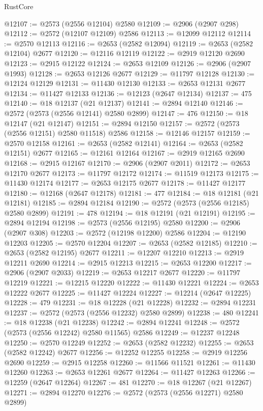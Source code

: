 \begin{lexlean}{RustCore}
\begin{coremodule}
@12107 := @2573 (@2556 @12104) @2580
@12109 := @2906 (@2907 @298)
@12112 := @2572 (@12107 @12109) @2586
@12113 := @12099 @12112
@12114 := @2570 @12113
@12116 := @2653 (@2582 @12094)
@12119 := @2653 (@2582 @12104) @2677
@12120 := @12116 @12119
@12122 := @2919 @12120 @2690
@12123 := @2915 @12122
@12124 := @2653 @12109
@12126 := @2906 (@2907 @1993)
@12128 := @2653 @12126 @2677
@12129 := @11797 @12128
@12130 := @12124 @12129
@12131 := @11430 @12130
@12133 := @2653 @12131 @2677
@12134 := @11427 @12133
@12136 := @12123 (@2647 @12134)
@12137 := 475
@12140 := @18 @12137 (@21 @12137)
@12141 := @2894 @12140
@12146 := @2572 (@2573 (@2556 @12141) @2580 @2899)
@12147 := 476
@12150 := @18 @12147 (@21 @12147)
@12151 := @2894 @12150
@12157 := @2572 (@2573 (@2556 @12151) @2580 @11518) @2586
@12158 := @12146 @12157
@12159 := @2570 @12158
@12161 := @2653 (@2582 @12141)
@12164 := @2653 (@2582 @12151) @2677
@12165 := @12161 @12164
@12167 := @2919 @12165 @2690
@12168 := @2915 @12167
@12170 := @2906 (@2907 @2011)
@12172 := @2653 @12170 @2677
@12173 := @11797 @12172
@12174 := @11519 @12173
@12175 := @11430 @12174
@12177 := @2653 @12175 @2677
@12178 := @11427 @12177
@12180 := @12168 (@2647 @12178)
@12181 := 477
@12184 := @18 @12181 (@21 @12181)
@12185 := @2894 @12184
@12190 := @2572 (@2573 (@2556 @12185) @2580 @2899)
@12191 := 478
@12194 := @18 @12191 (@21 @12191)
@12195 := @2894 @12194
@12198 := @2573 (@2556 @12195) @2580
@12200 := @2906 (@2907 @308)
@12203 := @2572 (@12198 @12200) @2586
@12204 := @12190 @12203
@12205 := @2570 @12204
@12207 := @2653 (@2582 @12185)
@12210 := @2653 (@2582 @12195) @2677
@12211 := @12207 @12210
@12213 := @2919 @12211 @2690
@12214 := @2915 @12213
@12215 := @2653 @12200
@12217 := @2906 (@2907 @2033)
@12219 := @2653 @12217 @2677
@12220 := @11797 @12219
@12221 := @12215 @12220
@12222 := @11430 @12221
@12224 := @2653 @12222 @2677
@12225 := @11427 @12224
@12227 := @12214 (@2647 @12225)
@12228 := 479
@12231 := @18 @12228 (@21 @12228)
@12232 := @2894 @12231
@12237 := @2572 (@2573 (@2556 @12232) @2580 @2899)
@12238 := 480
@12241 := @18 @12238 (@21 @12238)
@12242 := @2894 @12241
@12248 := @2572 (@2573 (@2556 @12242) @2580 @11565) @2586
@12249 := @12237 @12248
@12250 := @2570 @12249
@12252 := @2653 (@2582 @12232)
@12255 := @2653 (@2582 @12242) @2677
@12256 := @12252 @12255
@12258 := @2919 @12256 @2690
@12259 := @2915 @12258
@12260 := @11566 @11521
@12261 := @11430 @12260
@12263 := @2653 @12261 @2677
@12264 := @11427 @12263
@12266 := @12259 (@2647 @12264)
@12267 := 481
@12270 := @18 @12267 (@21 @12267)
@12271 := @2894 @12270
@12276 := @2572 (@2573 (@2556 @12271) @2580 @2899)

\end{coremodule}
\end{lexlean}
